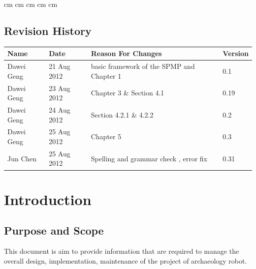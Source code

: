 \documentclass[11pt, a4paper]{report}
\begin{document}
 cm
 cm
 cm
 cm
 cm

\tableofcontents






\clearpage
\section*{Revision History}
\begin{tabular}{| l | l | l | l | }
\hline
Name      		&	Date        	&	Reason For Changes                  	  	&	Version     	\\ \hline
Dawei Geng      & 	21 Aug 2012    	& 	basic framework of the SPMP and Chapter 1 	&	0.1             \\ \hline
Dawei Geng      & 	23 Aug 2012    	& 	Chapter 3 \& Section 4.1 				    &	0.19			\\ \hline
Dawei Geng      &	24 Aug 2012     &	Section 4.2.1 \& 4.2.2                 		&	0.2 	     	\\ \hline
Dawei Geng     	&	25 Aug 2012     &	Chapter 5                  	  				&	0.3		    	\\ \hline
Jun Chen      	   &	25 Aug 2012        	&	Spelling and grammar check , error fix               	  	&	0.31     	\\ \hline






\end{tabular}
\clearpage


\chapter{Introduction}

\section{Purpose and Scope}
This document is aim to provide information that are required to manage the overall design, implementation, maintenance of the project of archaeology robot. 
\end{document}
